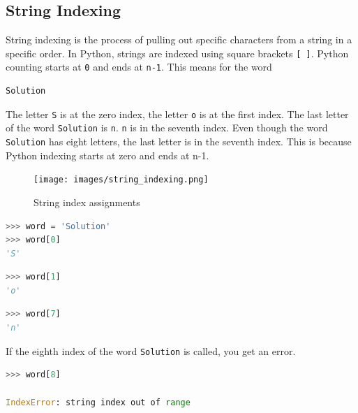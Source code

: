 \documentclass{book}
\begin{document}
    
        \subsection{String Indexing}\label{string-indexing}

String indexing is the process of pulling out specific characters from a
string in a specific order. In Python, strings are indexed using square
brackets \lstinline![ ]!. Python counting starts at \lstinline!0! and
ends at \lstinline!n-1!. This means for the word

\begin{lstlisting}
Solution
\end{lstlisting}

The letter \lstinline!S! is at the zero index, the letter \lstinline!o!
is at the first index. The last letter of the word \lstinline!Solution!
is \lstinline!n!. \lstinline!n! is in the seventh index. Even though the
word \lstinline!Solution! has eight letters, the last letter is in the
seventh index. This is because Python indexing starts at zero and ends
at n-1.

\begin{figure}
\centering
\texttt{[image: images/string\_indexing.png]}
\caption{String index assignments}
\end{figure}
    




    
        \begin{lstlisting}[language=Python]
>>> word = 'Solution'
>>> word[0]
'S'
\end{lstlisting}
    




    
        \begin{lstlisting}[language=Python]
>>> word[1]
'o'
\end{lstlisting}
    




    
        \begin{lstlisting}[language=Python]
>>> word[7]
'n'
\end{lstlisting}
    




    
        If the eighth index of the word \lstinline!Solution! is called, you get
an error.

\begin{lstlisting}[language=Python]
>>> word[8]

IndexError: string index out of range
\end{lstlisting}
    
\end{document}
